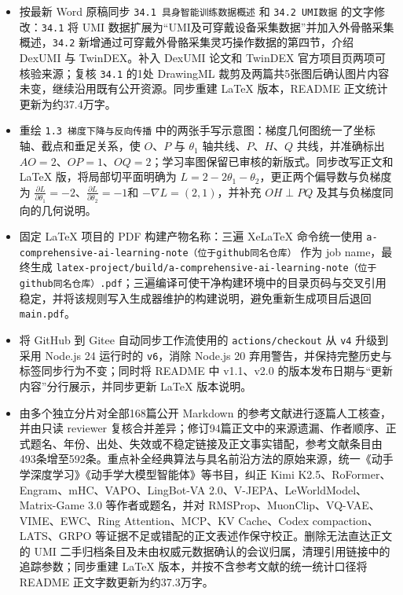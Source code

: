 \begin{itemize}
\item
  按最新 Word 原稿同步 \texttt{34.1\ 具身智能训练数据概述} 和 \texttt{34.2\ UMI数据} 的文字修改：\texttt{34.1} 将 UMI 数据扩展为``UMI及可穿戴设备采集数据''并加入外骨骼采集概述，\texttt{34.2} 新增通过可穿戴外骨骼采集灵巧操作数据的第四节，介绍 DexUMI 与 TwinDEX。补入 DexUMI 论文和 TwinDEX 官方项目页两项可核验来源；复核 \texttt{34.1} 的1处 DrawingML 裁剪及两篇共5张图后确认图片内容未变，继续沿用既有公开资源。同步重建 LaTeX 版本，README 正文统计更新为约37.4万字。
\item
  重绘 \texttt{1.3\ 梯度下降与反向传播} 中的两张手写示意图：梯度几何图统一了坐标轴、截点和垂足关系，使 \(O\)、\(P\) 与 \(\theta_1\) 轴共线、\(P\)、\(H\)、\(Q\) 共线，并准确标出 \(AO=2\)、\(OP=1\)、\(OQ=2\)；学习率图保留已审核的新版式。同步改写正文和 LaTeX 版，将局部切平面明确为 \(L=2-2\theta_1-\theta_2\)，更正两个偏导数与负梯度为 \(\frac{\partial L}{\partial\theta_1}=-2\)、\(\frac{\partial L}{\partial\theta_2}=-1\)和 \(-\nabla L=(2,1)\)，并补充 \(OH\perp PQ\) 及其与负梯度同向的几何说明。
\item
  固定 LaTeX 项目的 PDF 构建产物名称：三遍 XeLaTeX 命令统一使用 \texttt{a-comprehensive-ai-learning-note（位于github同名仓库）} 作为 job name，最终生成 \texttt{latex-project/build/a-comprehensive-ai-learning-note（位于github同名仓库）.pdf}；三遍编译可使干净构建环境中的目录页码与交叉引用稳定，并将该规则写入生成器维护的构建说明，避免重新生成项目后退回 \texttt{main.pdf}。
\item
  将 GitHub 到 Gitee 自动同步工作流使用的 \texttt{actions/checkout} 从 \texttt{v4} 升级到采用 Node.js 24 运行时的 \texttt{v6}，消除 Node.js 20 弃用警告，并保持完整历史与标签同步行为不变；同时将 README 中 v1.1、v2.0 的版本发布日期与``更新内容''分行展示，并同步更新 LaTeX 版本说明。
\item
  由多个独立分片对全部168篇公开 Markdown 的参考文献进行逐篇人工核查，并由只读 reviewer 复核合并差异；修订94篇正文中的来源遗漏、作者顺序、正式题名、年份、出处、失效或不稳定链接及正文事实错配，参考文献条目由493条增至592条。重点补全经典算法与具名前沿方法的原始来源，统一《动手学深度学习》《动手学大模型智能体》等书目，纠正 Kimi K2.5、RoFormer、Engram、mHC、VAPO、LingBot-VA 2.0、V-JEPA、LeWorldModel、Matrix-Game 3.0 等作者或题名，并对 RMSProp、MuonClip、VQ-VAE、VIME、EWC、Ring Attention、MCP、KV Cache、Codex compaction、LATS、GRPO 等证据不足或错配的正文表述作保守校正。删除无法直达正文的 UMI 二手归档条目及未由权威元数据确认的会议归属，清理引用链接中的追踪参数；同步重建 LaTeX 版本，并按不含参考文献的统一统计口径将 README 正文字数更新为约37.3万字。

\end{itemize}
